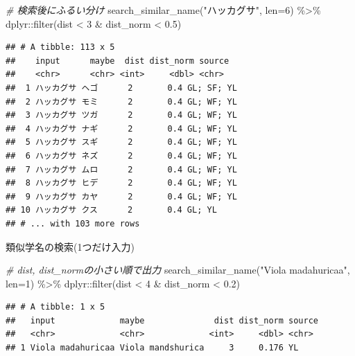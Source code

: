 \documentclass[
  a5paper,
  landscape,
  notitlepage]{report}
\newenvironment{Shaded}{\begin{snugshade}}{\end{snugshade}}
\newcommand{\AttributeTok}[1]{\textcolor[rgb]{0.77,0.63,0.00}{#1}}
\newcommand{\CommentTok}[1]{\textcolor[rgb]{0.56,0.35,0.01}{\textit{#1}}}
\newcommand{\DecValTok}[1]{\textcolor[rgb]{0.00,0.00,0.81}{#1}}
\newcommand{\FloatTok}[1]{\textcolor[rgb]{0.00,0.00,0.81}{#1}}
\newcommand{\FunctionTok}[1]{\textcolor[rgb]{0.00,0.00,0.00}{#1}}
\newcommand{\NormalTok}[1]{#1}
\newcommand{\SpecialCharTok}[1]{\textcolor[rgb]{0.00,0.00,0.00}{#1}}
\newcommand{\StringTok}[1]{\textcolor[rgb]{0.31,0.60,0.02}{#1}}
\begin{document}
\begin{Shaded}
\begin{Highlighting}[]
  \CommentTok{\# 検索後にふるい分け}
\FunctionTok{search\_similar\_name}\NormalTok{(}\StringTok{"ハッカグサ"}\NormalTok{, }\AttributeTok{len=}\DecValTok{6}\NormalTok{) }\SpecialCharTok{\%\textgreater{}\%}
\NormalTok{  dplyr}\SpecialCharTok{::}\FunctionTok{filter}\NormalTok{(dist }\SpecialCharTok{\textless{}} \DecValTok{3} \SpecialCharTok{\&}\NormalTok{ dist\_norm }\SpecialCharTok{\textless{}} \FloatTok{0.5}\NormalTok{)}
\end{Highlighting}
\end{Shaded}

\begin{verbatim}
## # A tibble: 113 x 5
##    input      maybe  dist dist_norm source    
##    <chr>      <chr> <int>     <dbl> <chr>     
##  1 ハッカグサ ヘゴ      2       0.4 GL; SF; YL
##  2 ハッカグサ モミ      2       0.4 GL; WF; YL
##  3 ハッカグサ ツガ      2       0.4 GL; WF; YL
##  4 ハッカグサ ナギ      2       0.4 GL; WF; YL
##  5 ハッカグサ スギ      2       0.4 GL; WF; YL
##  6 ハッカグサ ネズ      2       0.4 GL; WF; YL
##  7 ハッカグサ ムロ      2       0.4 GL; WF; YL
##  8 ハッカグサ ヒデ      2       0.4 GL; WF; YL
##  9 ハッカグサ カヤ      2       0.4 GL; WF; YL
## 10 ハッカグサ クス      2       0.4 GL; YL    
## # ... with 103 more rows
\end{verbatim}

\newpage

\fontsize{32pt}{32pt}\selectfont

\begin{center}
類似学名の検索(1つだけ入力)
\end{center}

\fontsize{14pt}{14pt}\selectfont

\begin{Shaded}
\begin{Highlighting}[]
  \CommentTok{\# dist, dist\_normの小さい順で出力}
\FunctionTok{search\_similar\_name}\NormalTok{(}\StringTok{"Viola madahuricaa"}\NormalTok{, }\AttributeTok{len=}\DecValTok{1}\NormalTok{) }\SpecialCharTok{\%\textgreater{}\%}
\NormalTok{  dplyr}\SpecialCharTok{::}\FunctionTok{filter}\NormalTok{(dist }\SpecialCharTok{\textless{}} \DecValTok{4} \SpecialCharTok{\&}\NormalTok{ dist\_norm }\SpecialCharTok{\textless{}} \FloatTok{0.2}\NormalTok{)}
\end{Highlighting}
\end{Shaded}

\begin{verbatim}
## # A tibble: 1 x 5
##   input             maybe              dist dist_norm source
##   <chr>             <chr>             <int>     <dbl> <chr> 
## 1 Viola madahuricaa Viola mandshurica     3     0.176 YL
\end{verbatim}
\end{document}
